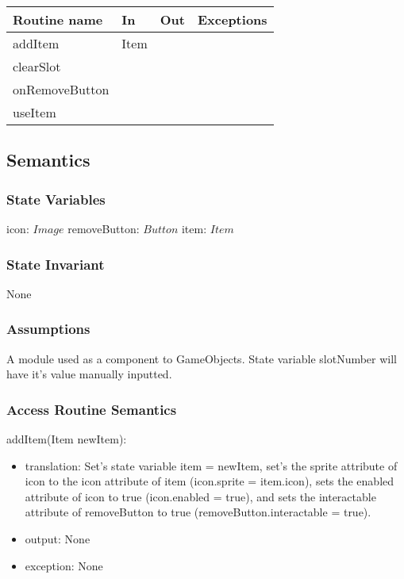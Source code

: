 \documentclass[12pt]{article}
\begin{document}
\begin{tabular}{| l | l | l | l |}
\hline
\textbf{Routine name} & \textbf{In} & \textbf{Out} & \textbf{Exceptions}\\
\hline
addItem & Item & ~  & ~\\
clearSlot & ~ & ~ & ~\\
onRemoveButton & ~ & ~ & ~\\
useItem & ~ & ~ & ~\\
\hline
\end{tabular}

\subsection* {Semantics}

\subsubsection* {State Variables}

icon: $Image$
removeButton: $Button$
item: $Item$

\subsubsection* {State Invariant}

None

\subsubsection* {Assumptions}

A module used as a component to GameObjects. State variable slotNumber will have it's value manually inputted.

\subsubsection* {Access Routine Semantics}

\noindent addItem(Item newItem):
\begin{itemize}
\item translation: Set's state variable item = newItem, set's the sprite attribute of icon to the icon attribute of item (icon.sprite = item.icon), sets the enabled attribute of icon to true (icon.enabled = true), and sets the interactable attribute of removeButton to true (removeButton.interactable = true).
\item output: None
\item exception: None
\end{itemize}
\end{document}
